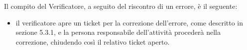 Il compito del Verificatore, a seguito del riscontro di un errore, è il seguente:
\begin{itemize}
\item {} il verificatore apre un ticket per la correzione dell'errore, come descritto in sezione 5.3.1, e la persona responsabile dell'attività procederà nella correzione, chiudendo così il relativo ticket aperto.
\end{itemize}



